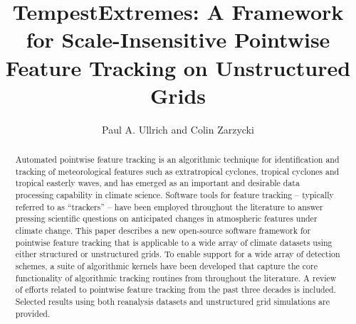 \documentclass[gmdd, hvmath, online]{copernicus_discussions}
\begin{document}
\linenumbers

\title{TempestExtremes:  A Framework for Scale-Insensitive Pointwise Feature Tracking on Unstructured Grids}

\author{Paul A. Ullrich and Colin Zarzycki}







\received{}
\pubdiscuss{} %
\revised{}
\accepted{}
\published{}




\maketitle  %



\begin{abstract}
Automated pointwise feature tracking is an algorithmic technique for identification and tracking of meteorological features such as extratropical cyclones, tropical cyclones and tropical easterly waves, and has emerged as an important and desirable data processing capability in climate science.  Software tools for feature tracking -- typically referred to as ``trackers'' -- have been employed throughout the literature to answer pressing scientific questions on anticipated changes in atmospheric features under climate change.  This paper describes a new open-source software framework for pointwise feature tracking that is applicable to a wide array of climate datasets using either structured or unstructured grids.  To enable support for a wide array of detection schemes, a suite of algorithmic kernels have been developed that capture the core functionality of algorithmic tracking routines from throughout the literature.  A review of efforts related to pointwise feature tracking from the past three decades is included.  Selected results using both reanalysis datasets and unstructured grid simulations are provided.
\end{abstract}
\end{document}
